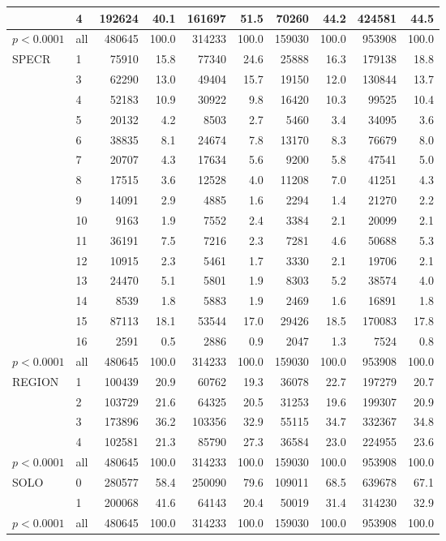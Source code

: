 \documentclass[11pt, oneside]{article}        %
\begin{document}
\begin{table}[ht]
{\begin{tabular}{ll|rr|rr|rr|rr}
   & 4 & 192624 & 40.1 & 161697 & 51.5 & 70260 & 44.2 & 424581 & 44.5 \\ 
   \hline
$p< 0.0001$ & all & 480645 & 100.0 & 314233 & 100.0 & 159030 & 100.0 & 953908 & 100.0 \\ 
   \hline
\hline
SPECR & 1 & 75910 & 15.8 & 77340 & 24.6 & 25888 & 16.3 & 179138 & 18.8 \\ 
   & 3 & 62290 & 13.0 & 49404 & 15.7 & 19150 & 12.0 & 130844 & 13.7 \\ 
   & 4 & 52183 & 10.9 & 30922 & 9.8 & 16420 & 10.3 & 99525 & 10.4 \\ 
   & 5 & 20132 & 4.2 & 8503 & 2.7 & 5460 & 3.4 & 34095 & 3.6 \\ 
   & 6 & 38835 & 8.1 & 24674 & 7.8 & 13170 & 8.3 & 76679 & 8.0 \\ 
   & 7 & 20707 & 4.3 & 17634 & 5.6 & 9200 & 5.8 & 47541 & 5.0 \\ 
   & 8 & 17515 & 3.6 & 12528 & 4.0 & 11208 & 7.0 & 41251 & 4.3 \\ 
   & 9 & 14091 & 2.9 & 4885 & 1.6 & 2294 & 1.4 & 21270 & 2.2 \\ 
   & 10 & 9163 & 1.9 & 7552 & 2.4 & 3384 & 2.1 & 20099 & 2.1 \\ 
   & 11 & 36191 & 7.5 & 7216 & 2.3 & 7281 & 4.6 & 50688 & 5.3 \\ 
   & 12 & 10915 & 2.3 & 5461 & 1.7 & 3330 & 2.1 & 19706 & 2.1 \\ 
   & 13 & 24470 & 5.1 & 5801 & 1.9 & 8303 & 5.2 & 38574 & 4.0 \\ 
   & 14 & 8539 & 1.8 & 5883 & 1.9 & 2469 & 1.6 & 16891 & 1.8 \\ 
   & 15 & 87113 & 18.1 & 53544 & 17.0 & 29426 & 18.5 & 170083 & 17.8 \\ 
   & 16 & 2591 & 0.5 & 2886 & 0.9 & 2047 & 1.3 & 7524 & 0.8 \\ 
   \hline
$p< 0.0001$ & all & 480645 & 100.0 & 314233 & 100.0 & 159030 & 100.0 & 953908 & 100.0 \\ 
   \hline
\hline
REGION & 1 & 100439 & 20.9 & 60762 & 19.3 & 36078 & 22.7 & 197279 & 20.7 \\ 
   & 2 & 103729 & 21.6 & 64325 & 20.5 & 31253 & 19.6 & 199307 & 20.9 \\ 
   & 3 & 173896 & 36.2 & 103356 & 32.9 & 55115 & 34.7 & 332367 & 34.8 \\ 
   & 4 & 102581 & 21.3 & 85790 & 27.3 & 36584 & 23.0 & 224955 & 23.6 \\ 
   \hline
$p< 0.0001$ & all & 480645 & 100.0 & 314233 & 100.0 & 159030 & 100.0 & 953908 & 100.0 \\ 
   \hline
\hline
SOLO & 0 & 280577 & 58.4 & 250090 & 79.6 & 109011 & 68.5 & 639678 & 67.1 \\ 
   & 1 & 200068 & 41.6 & 64143 & 20.4 & 50019 & 31.4 & 314230 & 32.9 \\ 
   \hline
$p< 0.0001$ & all & 480645 & 100.0 & 314233 & 100.0 & 159030 & 100.0 & 953908 & 100.0 \\ 
   \hline
\hline
\end{tabular}
}

\label{tab:descriptive.1}
\end{table}
\end{document}
